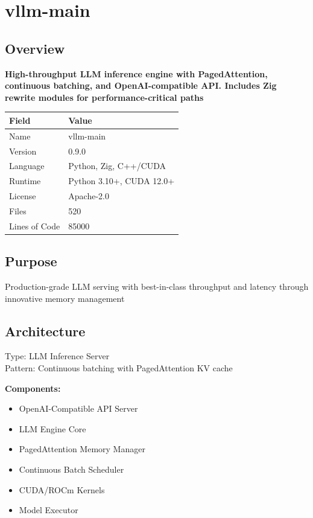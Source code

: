 \documentclass[11pt,a4paper]{article}
\begin{document}
\newpage


\section{vllm-main}

\subsection{Overview}

\textbf{High-throughput LLM inference engine with PagedAttention, continuous batching, and OpenAI-compatible API. Includes Zig rewrite modules for performance-critical paths}

\begin{tabular}{@{}ll@{}}
\toprule
\textbf{Field} & \textbf{Value} \\
\midrule
Name & vllm-main \\
Version & 0.9.0 \\
Language & Python, Zig, C++/CUDA \\
Runtime & Python 3.10+, CUDA 12.0+ \\
License & Apache-2.0 \\
Files & 520 \\
Lines of Code & 85000 \\
\bottomrule
\end{tabular}

\subsection{Purpose}
Production-grade LLM serving with best-in-class throughput and latency through innovative memory management

\subsection{Architecture}
Type: LLM Inference Server \\
Pattern: Continuous batching with PagedAttention KV cache

\textbf{Components:}\begin{itemize}[noitemsep]
\item OpenAI-Compatible API Server
\item LLM Engine Core
\item PagedAttention Memory Manager
\item Continuous Batch Scheduler
\item CUDA/ROCm Kernels
\item Model Executor
\end{itemize}
\end{document}
